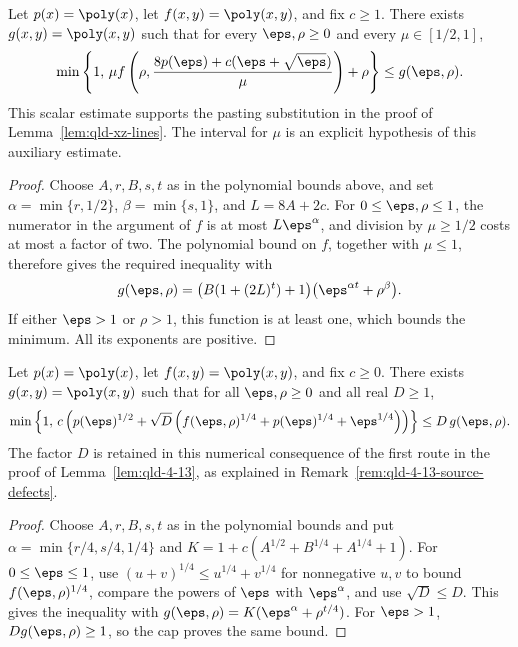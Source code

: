 \begin{theorem}
	\label{thm:qld-conditioned-polynomial-bound}
	\leanok
	Let $p(x)=\poly(x)$, let $f(x,y)=\poly(x,y)$, and fix $c\ge1$.
	There exists $g(x,y)=\poly(x,y)$ such that for every
	$\eps,\rho\ge0$ and every $\mu\in[1/2,1]$,
	\[
		\min\left\{1,\,
			\mu f\left(\rho,
				\frac{8p(\eps)+c(\eps+\sqrt{\eps})}{\mu}\right)+\rho
		\right\}
		\le g(\eps,\rho).
	\]
	This scalar estimate supports the pasting substitution in the proof of
	Lemma~\ref{lem:qld-xz-lines}. The interval for $\mu$ is an explicit
	hypothesis of this auxiliary estimate.
\end{theorem}
\begin{proof}
	\leanok
	Choose $A,r,B,s,t$ as in the polynomial bounds above, and set
	$\alpha=\min\{r,1/2\}$, $\beta=\min\{s,1\}$, and $L=8A+2c$.
	For $0\le\eps,\rho\le1$, the numerator in the argument of $f$ is at
	most $L\eps^\alpha$, and division by $\mu\ge1/2$ costs at most a
	factor of two. The polynomial bound on $f$, together with $\mu\le1$,
	therefore gives the required inequality with
	\[
		g(\eps,\rho)=\bigl(B(1+(2L)^t)+1\bigr)
			\bigl(\eps^{\alpha t}+\rho^\beta\bigr).
	\]
	If either $\eps>1$ or $\rho>1$, this function is at least one, which
	bounds the minimum. All its exponents are positive.
\end{proof}

\begin{theorem}
	\label{thm:qld-combining-polynomial-bound}
	\leanok
	Let $p(x)=\poly(x)$, let $f(x,y)=\poly(x,y)$, and fix $c\ge0$.
	There exists $g(x,y)=\poly(x,y)$ such that for all
	$\eps,\rho\ge0$ and all real $D\ge1$,
	\[
		\min\left\{1,\,
			c\left(p(\eps)^{1/2}+\sqrt D
				\left(f(\eps,\rho)^{1/4}
					+p(\eps)^{1/4}+\eps^{1/4}\right)\right)
		\right\}
		\le D\,g(\eps,\rho).
	\]
	The factor $D$ is retained in this numerical consequence of the first
	route in the proof of Lemma~\ref{lem:qld-4-13}, as explained in
	Remark~\ref{rem:qld-4-13-source-defects}.
\end{theorem}
\begin{proof}
	\leanok
	Choose $A,r,B,s,t$ as in the polynomial bounds and put
	$\alpha=\min\{r/4,s/4,1/4\}$ and
	$K=1+c(A^{1/2}+B^{1/4}+A^{1/4}+1)$.
	For $0\le\eps\le1$, use
	$(u+v)^{1/4}\le u^{1/4}+v^{1/4}$ for nonnegative $u,v$ to bound
	$f(\eps,\rho)^{1/4}$, compare the powers of $\eps$ with
	$\eps^\alpha$, and use $\sqrt D\le D$. This gives the inequality
	with $g(\eps,\rho)=K(\eps^\alpha+\rho^{t/4})$. For $\eps>1$,
	$Dg(\eps,\rho)\ge1$, so the cap proves the same bound.
\end{proof}

